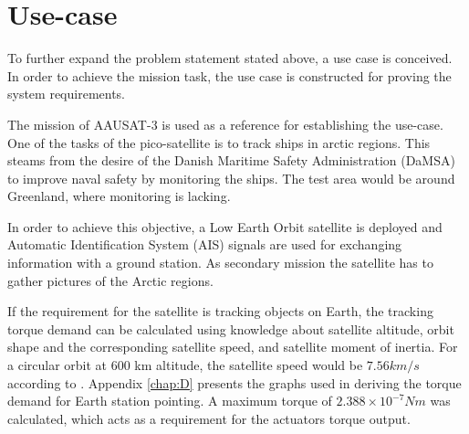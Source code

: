 
\section{Use-case}\label{sec:useCase}
To further expand the problem statement stated above, a use case is conceived. In order to achieve the mission task, the use case is constructed for proving the system requirements.

The mission of AAUSAT-3 is used as a reference for establishing the use-case. One of the tasks of the pico-satellite is to track ships in arctic regions. This steams from the desire of the Danish Maritime Safety Administration (DaMSA) to improve naval safety by monitoring the ships. The test area would be around Greenland, where monitoring is lacking. %


In order to achieve this objective, a Low Earth Orbit    satellite is deployed and Automatic Identification System (AIS) signals are used for exchanging information with a ground station. As secondary mission the satellite has to gather pictures of the Arctic regions.

If the requirement for the satellite is tracking objects on Earth, the tracking torque demand can be calculated using knowledge about satellite altitude, orbit shape and the corresponding satellite speed, and satellite moment of inertia. For a circular orbit at 600 km altitude, the satellite speed would be $7.56 km/s$  according to \cite{satSpeed}. Appendix \ref{chap:D} presents the graphs used in deriving the torque demand for Earth station pointing. A maximum torque of ${2.388 \times 10^{-7} Nm}$ was calculated, which acts as a requirement for the actuators torque output.
